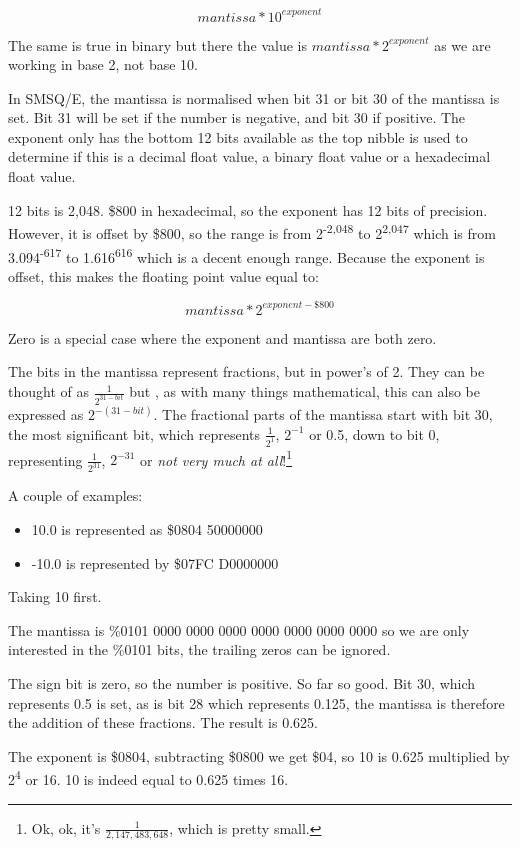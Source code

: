 \[
mantissa*10^{exponent}
\]

The same is true in binary but there the value is $mantissa*2^{exponent}$
as we are working in base 2, not base 10. 

In SMSQ/E, the mantissa is normalised when bit 31 or bit 30 of the
mantissa is set. Bit 31 will be set if the number is negative, and
bit 30 if positive. The exponent only has the bottom 12 bits available
as the top nibble is used to determine if this is a decimal float
value, a binary float value or a hexadecimal float value.

12 bits is 2,048. \$800 in hexadecimal, so the exponent has 12 bits
of precision. However, it is offset by \$800, so the range is from
2\textsuperscript{-2,048} to 2\textsuperscript{2,047} which is from
3.094\textsuperscript{-617} to 1.616\textsuperscript{616} which
is a decent enough range. Because the exponent is offset, this makes
the floating point value equal to:

\[
mantissa*2^{exponent-\$800}
\]

Zero is a special case where the exponent and mantissa are both zero.

The bits in the mantissa represent fractions, but in power's of 2.
They can be thought of as $\frac{1}{2^{31-bit}}$ but , as with many
things mathematical, this can also be expressed as $2^{-(31-bit)}$.
The fractional parts of the mantissa start with bit 30, the most significant
bit, which represents $\frac{1}{2^{1}}$, $2^{-1}$ or 0.5, down to
bit 0, representing $\frac{1}{2^{31}}$, $2^{-31}$ or \emph{not very
much at all}!\footnote{Ok, ok, it's $\frac{1}{2,147,483,648}$, which is pretty small.}

A couple of examples:
\begin{itemize}
\item 10.0 is represented as \$0804 50000000
\item -10.0 is represented by \$07FC D0000000
\end{itemize}
Taking 10 first.

The mantissa is \%0101 0000 0000 0000 0000 0000 0000 0000 so we are
only interested in the \%0101 bits, the trailing zeros can be ignored.

The sign bit is zero, so the number is positive. So far so good. Bit
30, which represents 0.5 is set, as is bit 28 which represents 0.125,
the mantissa is therefore the addition of these fractions. The result
is 0.625.

The exponent is \$0804, subtracting \$0800 we get \$04, so 10 is 0.625
multiplied by 2\textsuperscript{4 }or 16. 10 is indeed equal to 0.625
times 16.

